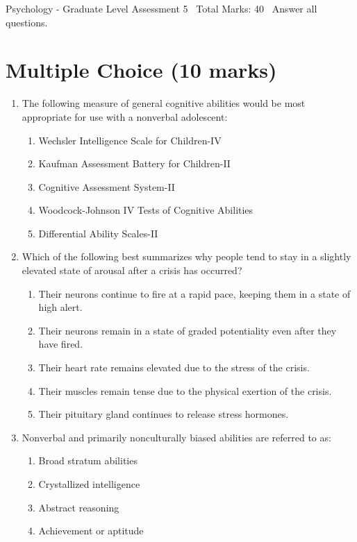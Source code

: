 \documentclass[12pt]{article}
\begin{document}
\begin{center}
Psychology - Graduate Level Assessment 5 \
Total Marks: 40 \
Answer all questions.
\end{center}

\section*{Multiple Choice (10 marks)}
\begin{enumerate}[label=\arabic*.]
\item The following measure of general cognitive abilities would be most appropriate for use with a nonverbal adolescent:
\begin{enumerate}[label=(\alph*)]
    \item Wechsler Intelligence Scale for Children-IV
    \item Kaufman Assessment Battery for Children-II
    \item Cognitive Assessment System-II
    \item Woodcock-Johnson IV Tests of Cognitive Abilities
    \item Differential Ability Scales-II
\end{enumerate}
\item Which of the following best summarizes why people tend to stay in a slightly elevated state of arousal after a crisis has occurred?
\begin{enumerate}[label=(\alph*)]
    \item Their neurons continue to fire at a rapid pace, keeping them in a state of high alert.
    \item Their neurons remain in a state of graded potentiality even after they have fired.
    \item Their heart rate remains elevated due to the stress of the crisis.
    \item Their muscles remain tense due to the physical exertion of the crisis.
    \item Their pituitary gland continues to release stress hormones.
\end{enumerate}
\item Nonverbal and primarily nonculturally biased abilities are referred to as:
\begin{enumerate}[label=(\alph*)]
    \item Broad stratum abilities
    \item Crystallized intelligence
    \item Abstract reasoning
    \item Achievement or aptitude

\end{enumerate}
\end{enumerate}
\end{document}
